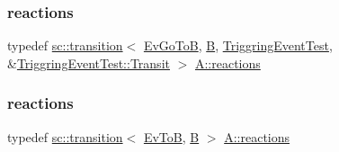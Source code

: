 \mbox{\label{struct_a_a05e1d654ca7a79baae73615a421909d1}} 
\subsubsection{\texorpdfstring{reactions}{reactions}\hspace{0.1cm}{\footnotesize\ttfamily [8/13]}}
{\footnotesize\ttfamily typedef \mbox{\hyperlink{classboost_1_1statechart_1_1transition}{sc\+::transition}}$<$ \mbox{\hyperlink{struct_ev_go_to_b}{Ev\+Go\+ToB}}, \mbox{\hyperlink{struct_b}{B}}, \mbox{\hyperlink{struct_triggring_event_test}{Triggring\+Event\+Test}}, \&\mbox{\hyperlink{struct_triggring_event_test_aa24d7f5136f07fac2ed5678f205c9a89}{Triggring\+Event\+Test\+::\+Transit}} $>$ \mbox{\hyperlink{struct_a_aaf7ef039e669b21e19f81777afeed659}{A\+::reactions}}}

\mbox{\label{struct_a_a14567593462fe87eb5c35b1c564dc869}} 
\subsubsection{\texorpdfstring{reactions}{reactions}\hspace{0.1cm}{\footnotesize\ttfamily [9/13]}}
{\footnotesize\ttfamily typedef \mbox{\hyperlink{classboost_1_1statechart_1_1transition}{sc\+::transition}}$<$ \mbox{\hyperlink{struct_ev_to_b}{Ev\+ToB}}, \mbox{\hyperlink{struct_b}{B}} $>$ \mbox{\hyperlink{struct_a_aaf7ef039e669b21e19f81777afeed659}{A\+::reactions}}}

\mbox{\label{struct_a_acf0421a3801f117c8a6d59698bdb3f40}} 
